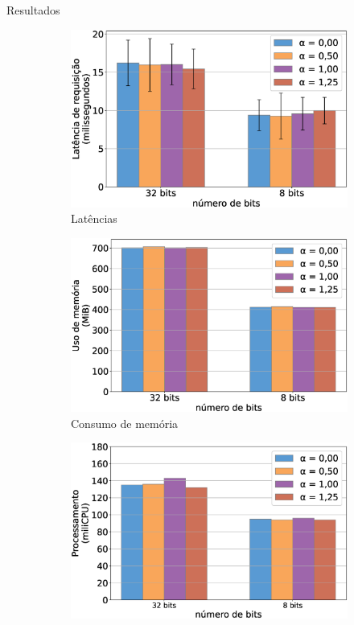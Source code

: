 \begin{frame}{Resultados}
    \begin{figure}[H]
        \centering
        \begin{subfigure}[b]{0.32\textwidth}
            \includegraphics[width=\textwidth]{figuras/latencia1.eps}
            \caption{\scriptsize{Latências}}
          \end{subfigure}  
          \begin{subfigure}[b]{0.32\textwidth}
            \includegraphics[width=\textwidth]{figuras/memoria1.eps}
            \caption{\scriptsize{Consumo de memória}}
        \end{subfigure}
        \begin{subfigure}[b]{0.32\textwidth}
            \includegraphics[width=\textwidth]{figuras/cpu1.eps}

\end{subfigure}
\end{figure}
\end{frame}
